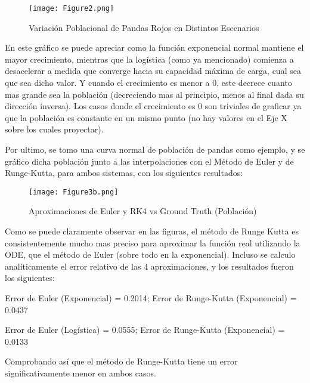 \documentclass{article}
\begin{document}
\begin{figure}[ht]
    \centering
    \caption{Variación Poblacional de Pandas Rojos en Distintos Escenarios}
    \texttt{[image: Figure2.png]}
    \label{fig:Image 1.1}
\end{figure}

\noindent En este gráfico se puede apreciar como la función exponencial normal mantiene el mayor crecimiento, mientras que la logística (como ya mencionado) comienza a desacelerar a medida que converge hacia su capacidad máxima de carga, cual sea que sea dicho valor. Y cuando el crecimiento es menor a 0, este decrece cuanto mas grande sea la población (decreciendo mas al principio, menos al final dada su dirección inversa). Los casos donde el crecimiento es 0 son triviales de graficar ya que la población es constante en un mismo punto (no hay valores en el Eje X sobre los cuales proyectar). \vspace{1\baselineskip}

\noindent Por ultimo, se tomo una curva normal de población de pandas como ejemplo, y se gráfico dicha población junto a las interpolaciones con el Método de Euler y de Runge-Kutta, para ambos sistemas, con los siguientes resultados:

\begin{figure}[ht]
    \centering
    \caption{Aproximaciones de Euler y RK4 vs Ground Truth (Población)}
    \texttt{[image: Figure3b.png]}
    \label{fig:Image 1.1}
\end{figure}

\noindent Como se puede claramente observar en las figuras, el método de Runge Kutta es consistentemente mucho mas preciso para aproximar la función real utilizando la ODE, que el método de Euler (sobre todo en la exponencial). Incluso se calculo analíticamente el error relativo de las 4 aproximaciones, y los resultados fueron los siguientes: \vspace{1\baselineskip}

\noindent Error de Euler (Exponencial) = 0.2014; Error de Runge-Kutta (Exponencial) = 0.0437
\vspace{1\baselineskip}

\noindent Error de Euler (Logística) = 0.0555; Error de Runge-Kutta (Exponencial) = 0.0133
\vspace{1\baselineskip}

\noindent Comprobando así que el método de Runge-Kutta tiene un error significativamente menor en ambos casos.
\end{document}
